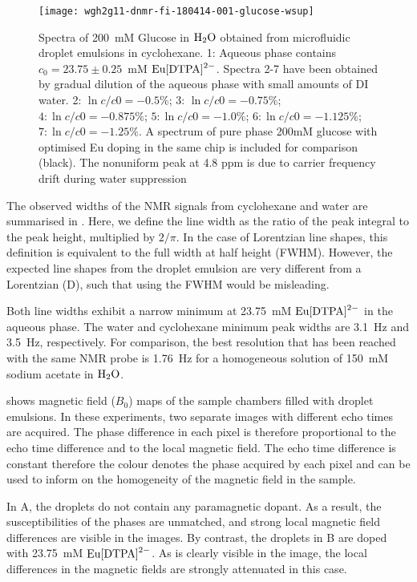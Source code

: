 \begin{figure}
\begin{center}
	\texttt{[image: wgh2g11-dnmr-fi-180414-001-glucose-wsup]}
\end{center}
\caption{Spectra of 200~mM Glucose in $\ce{H_2O}$ obtained from microfluidic droplet emulsions in
	cyclohexane. 1: Aqueous phase contains $c_0=23.75\pm0.25$~mM $\ce{Eu[DTPA]^{2-}}$. Spectra 2-7
	have been obtained by gradual dilution of the aqueous phase with small amounts of DI water.
	2: $\ln c/c0 = -0.5\%$; 3: $\ln c/c0 = -0.75\%$; $4: \ln c/c0 = -0.875\%$;
	$5: \ln c/c0 = -1.0\%$; $6: \ln c/c0 = -1.125\%$; $7: \ln c/c0 = -1.25\%$. A spectrum of pure phase 200mM glucose
	with optimised Eu doping in the same chip is included for comparison (black). The nonuniform peak at 4.8 ppm is due to carrier frequency drift during water suppression }
\label{fig:glucose-dilution}
\end{figure}


The observed widths of the NMR signals from cyclohexane and water
are summarised in . Here, we define the line width as
the ratio of the peak integral to the peak height, multiplied by $2/\pi$. In the
case of Lorentzian line shapes, this definition is equivalent to the full width at half height
(FWHM). However, the expected line shapes from the droplet emulsion are very different
from a Lorentzian (D), such that using the FWHM would be misleading.

Both line widths exhibit a narrow
minimum at 23.75~mM $\ce{Eu[DTPA]^{2-}}$ in the aqueous phase. The water and
cyclohexane minimum peak widths are 3.1~Hz and 3.5~Hz, respectively. For comparison, the best resolution
that has been reached with the same NMR probe is 1.76~Hz for a homogeneous
solution of 150~mM sodium acetate in $\ce{H_2O}$.\citep{Finch:2016gv}

 shows magnetic field ($B_0$) maps of the sample chambers filled
with droplet emulsions.
In these experiments, two separate
images with different echo times are acquired. The phase difference in each pixel is therefore
proportional to the echo time difference and to the local magnetic field. The echo time difference is constant
therefore the colour denotes the phase acquired by each pixel and can be used to
inform on the homogeneity of the magnetic field in the sample.

In A, the droplets do not contain any paramagnetic dopant. As a result, the
susceptibilities of the phases are unmatched, and strong local magnetic field differences
are visible in the images. By contrast, the droplets in B are doped with 23.75~mM
$\ce{Eu[DTPA]^{2-}}$. As is clearly visible in the image, the local differences in the magnetic
fields are strongly attenuated in this case.

